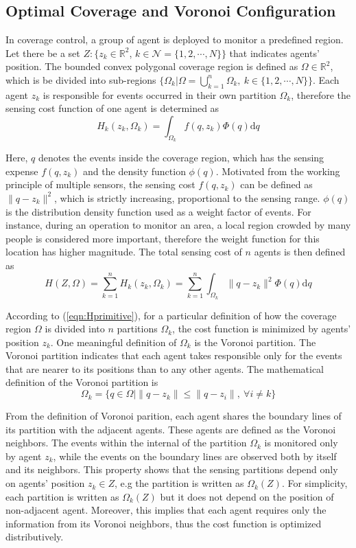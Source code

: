 \documentclass[journal]{IEEEtran}
\begin{document}
	\subsection{Optimal Coverage and Voronoi Configuration}
	{\color{blue}
	In coverage control, a group of agent is deployed to monitor a predefined region. Let there be a set $Z: \{z_k \in \mathbb{R}^2$, $k\in \mathcal{N} =\{1,2,\cdots,N\}\}$ that indicates agents' position. The bounded convex polygonal coverage region is defined as $\Omega \in \mathbb{R}^2$, which is be divided into sub-regions $\{\Omega_k| \Omega = \bigcup\limits_{k=1}^{n} \Omega_{k}, ~k \in \{1,2,\cdots,N\} \}$. Each agent $z_k$ is responsible for events occurred in their own partition $\Omega_k$, therefore the sensing cost function of one agent is determined as
	\[H_k(z_k, \Omega_k) = \int_{\Omega_k} f(q, z_k) \Phi(q) \mathrm{d}q\] 
	
	Here, $q$ denotes the events inside the coverage region, which has the sensing expense $f(q, z_k)$ and the density function $\phi(q)$. Motivated from the working principle of multiple sensors, the sensing cost $f(q, z_k)$ can be defined as $\|q-z_k\|^2$, which is strictly increasing, proportional to the sensing range. $\phi(q)$ is the distribution density function used as a weight factor of events. For instance, during an operation to monitor an area, a local region crowded by many people is considered more important, therefore the weight function for this location has higher magnitude. The total sensing cost of $n$ agents is then defined as
	\begin{equation} \label{eqn:Hprimitive}
		H(Z, \Omega) = \sum_{k = 1}^{n} H_k(z_k, \Omega_k) = \sum_{k = 1}^{n} \int_{\Omega_k} \|q-z_k\|^2 \Phi(q) \mathrm{d}q
	\end{equation}
	
	According to (\ref{eqn:Hprimitive}), for a particular definition of how the coverage region $\Omega$ is divided into $n$ partitions $\Omega_k$, the cost function is minimized by agents' position $z_k$. One meaningful definition of $\Omega_k$ is the Voronoi partition. The Voronoi partition indicates that each agent takes responsible only for the events that are nearer to its positions than to any other agents. The mathematical definition of the Voronoi partition is
	\[\Omega_{k} = \{q \in \Omega | \|q - z_k\| \leq \|q - z_i\|, ~\forall i \neq k\} \] 
	
	From the definition of Voronoi parition, each agent shares the boundary lines of its partition with the adjacent agents. These agents are defined as the Voronoi neighbors. The events within the internal of the partition $\Omega_k$ is monitored only by agent $z_k$, while the events on the boundary lines are observed both by itself and its neighbors. This property shows that the sensing partitions depend only on agents' position $z_k \in Z$, e.g the partition is written as $\Omega_k(Z)$. For simplicity, each partition is written as $\Omega_k(Z)$ but it does not depend on the position of non-adjacent agent. Moreover, this implies that each agent requires only the information from its Voronoi neighbors, thus the cost function is optimized distributively.    
	
}
\end{document}
